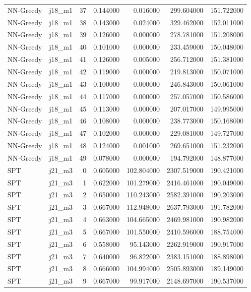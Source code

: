 \begin{tabular}{llrrrrr}
NN-Greedy & j18_m1 & 37 & 0.144000 & 0.016000 & 299.604000 & 151.722000 \\
NN-Greedy & j18_m1 & 38 & 0.143000 & 0.024000 & 329.462000 & 152.011000 \\
NN-Greedy & j18_m1 & 39 & 0.126000 & 0.000000 & 278.781000 & 151.208000 \\
NN-Greedy & j18_m1 & 40 & 0.101000 & 0.000000 & 233.459000 & 150.048000 \\
NN-Greedy & j18_m1 & 41 & 0.126000 & 0.005000 & 256.712000 & 151.381000 \\
NN-Greedy & j18_m1 & 42 & 0.119000 & 0.000000 & 219.813000 & 150.071000 \\
NN-Greedy & j18_m1 & 43 & 0.100000 & 0.000000 & 246.843000 & 150.061000 \\
NN-Greedy & j18_m1 & 44 & 0.117000 & 0.000000 & 257.057000 & 150.586000 \\
NN-Greedy & j18_m1 & 45 & 0.113000 & 0.000000 & 207.017000 & 149.995000 \\
NN-Greedy & j18_m1 & 46 & 0.108000 & 0.000000 & 238.773000 & 150.168000 \\
NN-Greedy & j18_m1 & 47 & 0.102000 & 0.000000 & 229.081000 & 149.727000 \\
NN-Greedy & j18_m1 & 48 & 0.124000 & 0.001000 & 269.651000 & 151.232000 \\
NN-Greedy & j18_m1 & 49 & 0.078000 & 0.000000 & 194.792000 & 148.877000 \\
SPT & j21_m3 & 0 & 0.605000 & 102.804000 & 2307.519000 & 190.421000 \\
SPT & j21_m3 & 1 & 0.622000 & 101.279000 & 2416.461000 & 190.049000 \\
SPT & j21_m3 & 2 & 0.650000 & 110.243000 & 2582.391000 & 190.203000 \\
SPT & j21_m3 & 3 & 0.667000 & 112.948000 & 2637.793000 & 191.782000 \\
SPT & j21_m3 & 4 & 0.663000 & 104.665000 & 2469.981000 & 190.982000 \\
SPT & j21_m3 & 5 & 0.667000 & 101.550000 & 2410.596000 & 188.754000 \\
SPT & j21_m3 & 6 & 0.558000 & 95.143000 & 2262.919000 & 190.917000 \\
SPT & j21_m3 & 7 & 0.640000 & 96.822000 & 2383.151000 & 188.898000 \\
SPT & j21_m3 & 8 & 0.666000 & 104.994000 & 2505.893000 & 189.149000 \\
SPT & j21_m3 & 9 & 0.667000 & 99.917000 & 2148.697000 & 190.537000 \\

\end{tabular}
